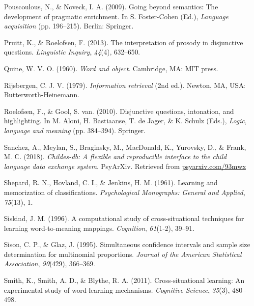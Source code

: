 \documentclass[
  ,man,floatsintext]{apa6}
\newlength{\cslhangindent}
\newlength{\cslentryspacingunit} %
\newenvironment{CSLReferences}[2] %
 {%
  \setlength{\parindent}{0pt}
  \ifodd #1
  \let\oldpar\par
  \def\par{\hangindent=\cslhangindent\oldpar}
  \fi
  \setlength{\parskip}{#2\cslentryspacingunit}
 }%
 {}
\begin{document}
\begin{CSLReferences}{1}{0}
\leavevmode{}%
Pouscoulous, N., \& Noveck, I. A. (2009). Going beyond semantics: The development of pragmatic enrichment. In S. Foster-Cohen (Ed.), \emph{Language acquisition} (pp. 196--215). Berlin: Springer.

\leavevmode{}%
Pruitt, K., \& Roelofsen, F. (2013). The interpretation of prosody in disjunctive questions. \emph{Linguistic Inquiry}, \emph{44}(4), 632--650.

\leavevmode{}%
Quine, W. V. O. (1960). \emph{Word and object}. Cambridge, MA: MIT press.

\leavevmode{}%
Rijsbergen, C. J. V. (1979). \emph{Information retrieval} (2nd ed.). Newton, MA, USA: Butterworth-Heinemann.

\leavevmode{}%
Roelofsen, F., \& Gool, S. van. (2010). Disjunctive questions, intonation, and highlighting. In M. Aloni, H. Bastiaanse, T. de Jager, \& K. Schulz (Eds.), \emph{Logic, language and meaning} (pp. 384--394). Springer.

\leavevmode{}%
Sanchez, A., Meylan, S., Braginsky, M., MacDonald, K., Yurovsky, D., \& Frank, M. C. (2018). \emph{Childes-db: A flexible and reproducible interface to the child language data exchange system}. PsyArXiv. Retrieved from \href{https://psyarxiv.com/93mwx}{psyarxiv.com/93mwx}

\leavevmode{}%
Shepard, R. N., Hovland, C. I., \& Jenkins, H. M. (1961). Learning and memorization of classifications. \emph{Psychological Monographs: General and Applied}, \emph{75}(13), 1.

\leavevmode{}%
Siskind, J. M. (1996). A computational study of cross-situational techniques for learning word-to-meaning mappings. \emph{Cognition}, \emph{61}(1-2), 39--91.

\leavevmode{}%
Sison, C. P., \& Glaz, J. (1995). Simultaneous confidence intervals and sample size determination for multinomial proportions. \emph{Journal of the American Statistical Association}, \emph{90}(429), 366--369.

\leavevmode{}%
Smith, K., Smith, A. D., \& Blythe, R. A. (2011). Cross-situational learning: An experimental study of word-learning mechanisms. \emph{Cognitive Science}, \emph{35}(3), 480--498.


\end{CSLReferences}
\end{document}
